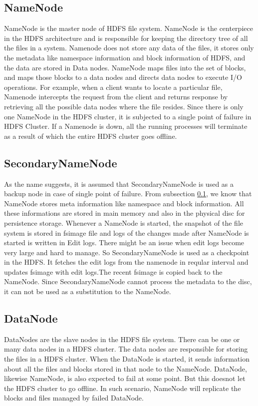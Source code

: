 \documentclass[11pt,a4paper,bibtotoc,idxtotoc,headsepline,footsepline,footexclude,BCOR12mm,DIV13]{scrbook}
\begin{document}
\subsection{NameNode}
\label{NameNode}
NameNode is the master node of HDFS file system. NameNode is the centerpiece in the HDFS architecture and is responsible for keeping the directory tree of all the files in a system\cite{HDFS:namenodeanddatanode}. Namenode does not store any data of the files, it stores 
only the metadata like namespace information and block information of HDFS\cite{HDFS:namenodeanddatanode}, and the data are stored in Data nodes. NameNode maps files into the set of blocks, and maps those blocks to a data nodes and directs data nodes to execute I/O operations\cite{HDFS:namenodeanddatanode}. For example, when a client wants to locate a particular file, Namenode intercepts the request from the client and returns response by retrieving all the possible data nodes where the file resides. Since there is only one NameNode in the HDFS cluster, it is subjected to a single point of failure in HDFS Cluster. If a Namenode is down, all the running processes will terminate as a result of which the entire HDFS cluster goes offline\cite{HDFS:namenodeanddatanode}.  

\subsection{SecondaryNameNode}
\label{SecondaryNameNode}
As the name suggests, it is assumed that SecondaryNameNode is used as a backup node in case of single point of failure. From subsection \ref{NameNode}, we know that NameNode stores meta information like namespace and block information. All these informations are stored in main memory and also in the physical disc for persistence storage\cite{HDFS:secondarynamenode}. Whenever a NameNode is started, the snapshot of the file system is stored in fsimage file and logs of the changes made after NameNode is started is written in Edit logs. There might be an issue when edit logs become very large and hard to manage. So SecondaryNameNode is used as a checkpoint in the HDFS. It fetches the edit logs from the namenode in reqular interval and updates fsimage with edit logs.The recent fsimage is copied back to the NameNode\cite{HDFS:secondarynamenode}. Since SecondaryNameNode cannot process the metadata to the disc\cite{HDFS:architecture}, it can not be used as a substitution to the NameNode.

\subsection{DataNode}
\label{DataNode}
DataNodes are the slave nodes in the HDFS file system. There can be one or many data nodes in a HDFS cluster. The data nodes are responsible for storing the files in a HDFS cluster. When the DataNode is started, it sends information about all the files and blocks stored in that node to the NameNode\cite{HDFS:datanode}. DataNode, likewise NameNode, is also expected to fail at some point. But this doesnot let the HDFS cluster to go offline. In such scenario, NameNode will replicate the blocks and files managed by failed DataNode\cite{HDFS:namenodeanddatanode}. 
\end{document}
